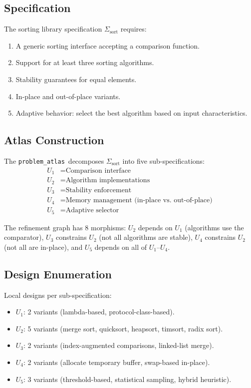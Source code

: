 \documentclass[11pt]{article}
\newcommand{\ProbAtlas}{\texttt{problem\_atlas}}
\begin{document}
\subsection{Specification}

The sorting library specification $\Sigma_{\text{sort}}$ requires:
\begin{enumerate}[noitemsep]
  \item A generic sorting interface accepting a comparison function.
  \item Support for at least three sorting algorithms.
  \item Stability guarantees for equal elements.
  \item In-place and out-of-place variants.
  \item Adaptive behavior: select the best algorithm based on input
        characteristics.
\end{enumerate}

\subsection{Atlas Construction}

The \ProbAtlas\ decomposes $\Sigma_{\text{sort}}$ into five
sub-specifications:
\begin{align*}
  U_1 &= \text{Comparison interface} \\
  U_2 &= \text{Algorithm implementations} \\
  U_3 &= \text{Stability enforcement} \\
  U_4 &= \text{Memory management (in-place vs.\ out-of-place)} \\
  U_5 &= \text{Adaptive selector}
\end{align*}

The refinement graph has 8 morphisms: $U_2$ depends on $U_1$
(algorithms use the comparator), $U_3$ constrains $U_2$ (not all
algorithms are stable), $U_4$ constrains $U_2$ (not all are in-place),
and $U_5$ depends on all of $U_1$--$U_4$.

\subsection{Design Enumeration}

Local designs per sub-specification:
\begin{itemize}[noitemsep]
  \item $U_1$: 2 variants (lambda-based, protocol-class-based).
  \item $U_2$: 5 variants (merge sort, quicksort, heapsort, timsort,
        radix sort).
  \item $U_3$: 2 variants (index-augmented comparisons, linked-list
        merge).
  \item $U_4$: 2 variants (allocate temporary buffer, swap-based
        in-place).
  \item $U_5$: 3 variants (threshold-based, statistical sampling,
        hybrid heuristic).
\end{itemize}
\end{document}
